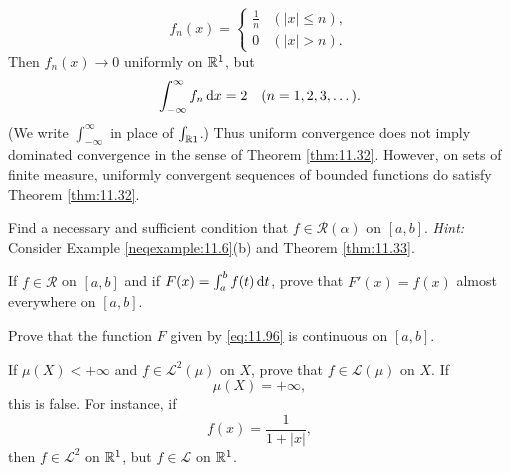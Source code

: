 \begin{myexercise}
    \label{ex:11.6}
    \begin{equation*}
        f_n(x) =
        \left\{
        \begin{array}{ll}
            \frac{1}{n} & (|x| \leq n), \\
            0           & (|x|    > n).
        \end{array}
        \right.
    \end{equation*}
    Then $f_n(x) \rightarrow 0$ uniformly on ${\protect\mathbb R}^1$, but
    \begin{equation*}
        \int_{-\infty}^{\infty} f_n \d x = 2
        \quad
        (n = 1,2,3,\dots).
    \end{equation*}
    (We write $\int_{-\infty}^{\infty}$ in place of $\int_{{\protect\mathbb R} 1}$.)
    Thus uniform convergence does not imply dominated convergence in the sense of Theorem \ref{thm:11.32}.
    However, on sets of finite measure, uniformly convergent sequences of bounded functions do satisfy Theorem \ref{thm:11.32}.
\end{myexercise}


\begin{myexercise}
    \label{ex:11.7}
    Find a necessary and sufficient condition that $f \in \mathscr{R}(\alpha)$ on $[a, b]$.
    \emph{Hint:} Consider Example \ref{neqexample:11.6}(b) and Theorem \ref{thm:11.33}.
\end{myexercise}


\begin{myexercise}
    \label{ex:11.8}
    If $f \in \mathscr{R}$ on $[a, b]$
    and if $F(x) = \int_{a}^{b} f(t) \d t$,
    prove that $F'(x) =f(x)$ almost everywhere on $[a, b]$.
\end{myexercise}


\begin{myexercise}
    \label{ex:11.9}
    Prove that the function $F$ given by \eqref{eq:11.96} is continuous on $[a, b]$.
\end{myexercise}



\begin{myexercise}
    \label{ex:11.10}
    If $\mu(X)<+\infty$ and $f \in \mathscr{L}^2 (\mu)$ on $X$,
    prove that $f \in \mathscr{L}(\mu)$ on $X$.
    If
    \begin{equation*}
        \mu(X) = +\infty,
    \end{equation*}
    this is false.
    For instance, if
    \begin{equation*}
        f(x) = \frac{1}{1+|x|},
    \end{equation*}
    then $f \in \mathscr{L}^2$ on ${\protect\mathbb R}^1$,
    but $f \in \mathscr{L}$ on ${\protect\mathbb R}^1$.
\end{myexercise}


